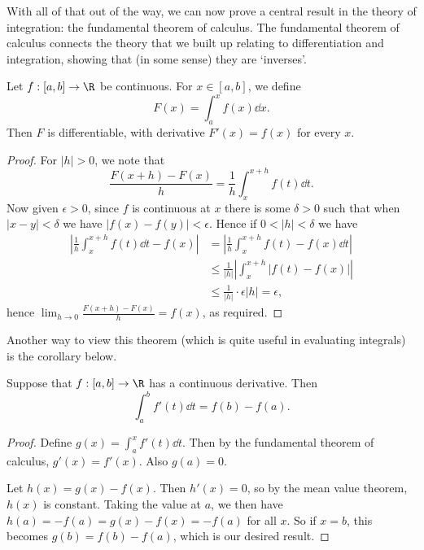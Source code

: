 \documentclass[a4paper]{scrartcl}
\begin{document}
With all of that out of the way, we can now prove a central result in the theory of integration: the fundamental theorem of calculus. The fundamental theorem of calculus connects the theory that we built up relating to differentiation and integration, showing that (in some sense) they are `inverses'.

\begin{theorem}
	Let $f: [a, b] \rightarrow \R $ be continuous. For $x \in [a, b]$, we define
	$$
	F(x) = \int_a^x f(x) \dd x.
	$$
	Then $F$ is differentiable, with derivative $F'(x) = f(x)$ for every $x$.
\end{theorem}
\begin{proof}
	For $|h| > 0$, we note that
	$$
	\frac{F(x + h) - F(x)}{h} = \frac{1}{h} \int_x^{x + h} f(t) \dd t.
	$$
	Now given $\epsilon > 0$, since $f$ is continuous at $x$ there is some $\delta > 0$ such that when $|x - y| < \delta$ we have $|f(x) - f(y)| < \epsilon$. Hence if $0 < |h| < \delta$ we have
	\begin{align*}
		\left|\frac{1}{h} \int_x^{x + h} f(t) \dd t - f(x)\right| &= \left|\frac{1}{h} \int_x^{x + h} f(t)  - f(x)\dd t\right| \\
		&\leq \frac{1}{|h|} \left|\int_x^{x + h} |f(t) - f(x)|\right| \\ 
		& \leq \frac{1}{|h|} \cdot \epsilon|h| = \epsilon,
	\end{align*}
	hence $\lim_{h \to 0}\frac{F(x + h)- F(x)}{h} = f(x)$, as required.
\end{proof}


Another way to view this theorem (which is quite useful in evaluating integrals) is the corollary below.

\begin{corollary}
	Suppose that $f: [a, b] \rightarrow \R$ has a continuous derivative. Then
	$$
	\int_a^b f'(t) \dd t = f(b) - f(a).
	$$
\end{corollary}
\begin{proof}
	Define $g(x) = \int_a^x f'(t) \dd t$. Then by the fundamental theorem of calculus, $g'(x) = f'(x)$. Also $g(a) = 0$.

	Let $h(x) = g(x) - f(x)$. Then $h'(x) = 0$, so by the mean value theorem, $h(x)$ is constant. Taking the value at $a$, we then have $h(a) = -f(a) = g(x) - f(x) = -f(a)$ for all $x$. So if $x = b$, this becomes $g(b) = f(b) - f(a)$, which is our desired result.
\end{proof}
\end{document}
